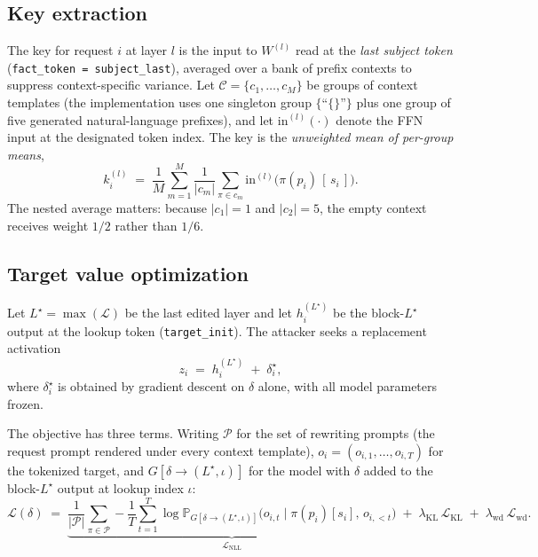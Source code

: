 \subsection{Key extraction}
\label{sec:keys}

The key for request $i$ at layer $l$ is the input to $W^{(l)}$ read at the
\emph{last subject token} (\texttt{fact\_token = subject\_last}), averaged over a
bank of prefix contexts to suppress context-specific variance. Let
$\mathcal{C} = \{c_1, \dots, c_M\}$ be groups of context templates
(the implementation uses one singleton group $\{\text{``\{\}''}\}$ plus one
group of five generated natural-language prefixes), and let
$\mathrm{in}^{(l)}(\cdot)$ denote the FFN input at the designated token index.
The key is the \emph{unweighted mean of per-group means},
%
\begin{equation}
  k_i^{(l)}
  \;=\;
  \frac{1}{M}\sum_{m=1}^{M}
  \frac{1}{|c_m|}\sum_{\pi \in c_m}
  \mathrm{in}^{(l)}\!\bigl(\pi(p_i)\,[\,s_i\,]\bigr).
  \label{eq:key}
\end{equation}
%
The nested average matters: because $|c_1| = 1$ and $|c_2| = 5$, the empty
context receives weight $1/2$ rather than $1/6$.

\subsection{Target value optimization}
\label{sec:value}

Let $L^\star = \max(\mathcal{L})$ be the last edited layer and let
$h_i^{(L^\star)}$ be the block-$L^\star$ output at the lookup token
(\texttt{target\_init}). The attacker seeks a replacement activation
%
\begin{equation}
  z_i \;=\; h_i^{(L^\star)} \;+\; \delta_i^\star,
  \label{eq:z-def}
\end{equation}
%
where $\delta_i^\star$ is obtained by gradient descent on $\delta$ alone, with
all model parameters frozen.

The objective has three terms. Writing $\mathcal{P}$ for the set of rewriting
prompts (the request prompt rendered under every context template),
$o_i = (o_{i,1},\dots,o_{i,T})$ for the tokenized target, and
$G[\delta \!\to\! (L^\star, \iota)]$ for the model with $\delta$ added to the
block-$L^\star$ output at lookup index $\iota$:
%
\begin{equation}
  \mathcal{L}(\delta)
  \;=\;
  \underbrace{\frac{1}{|\mathcal{P}|}\sum_{\pi \in \mathcal{P}}
    -\frac{1}{T}\sum_{t=1}^{T}
    \log \mathbb{P}_{G[\delta \to (L^\star,\iota)]}
    \bigl(o_{i,t} \mid \pi(p_i)[s_i],\, o_{i,<t}\bigr)}_{\mathcal{L}_{\text{NLL}}}
  \;+\;
  \lambda_{\text{KL}}\,\mathcal{L}_{\text{KL}}
  \;+\;
  \lambda_{\text{wd}}\,\mathcal{L}_{\text{wd}}.
  \label{eq:z-objective}
\end{equation}

